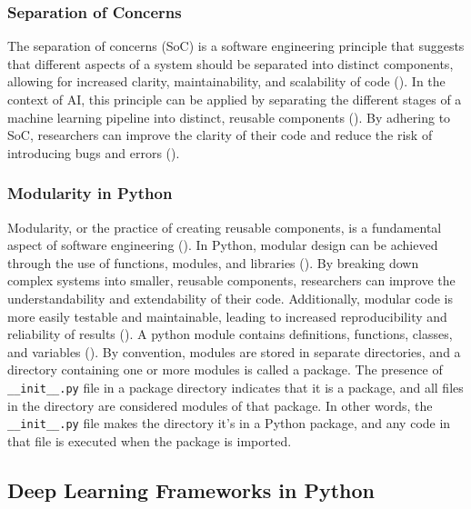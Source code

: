 \documentclass{IEEEtran}
\begin{document}
\subsubsection{Separation of Concerns}
 The separation of concerns (SoC) is a software engineering principle that suggests that different aspects of a system should be separated into distinct components, allowing for increased clarity, maintainability, and scalability of code (\cite{pressman2010software, de2002importance}). In the context of AI, this principle can be applied by separating the different stages of a machine learning pipeline into distinct, reusable components (\cite{mo2016decoupling,mo2016decoupling,pressman2010software, de2002importance}). By adhering to SoC, researchers can improve the clarity of their code and reduce the risk of introducing bugs and errors (\cite{mo2016decoupling,mo2016decoupling,pressman2010software, de2002importance}).

\subsubsection{Modularity in Python}
Modularity, or the practice of creating reusable components, is a fundamental aspect of software engineering (\cite{pressman2010software}). In Python, modular design can be achieved through the use of functions, modules, and libraries (\cite{sanner1999python}). By breaking down complex systems into smaller, reusable components, researchers can improve the understandability and extendability of their code. Additionally, modular code is more easily testable and maintainable, leading to increased reproducibility and reliability of results (\cite{amershi2019software,pressman2010software}).
A python module contains definitions, functions, classes, and variables (\cite{raschka2015python}). By convention, modules are stored in separate directories, and a directory containing one or more modules is called a package. The presence of \verb|__init__.py| file in a package directory indicates that it is a package, and all files in the directory are considered modules of that package. In other words, the \verb|__init__.py| file makes the directory it's in a Python package, and any code in that file is executed when the package is imported.



\subsection{Deep Learning Frameworks in Python}
\end{document}
